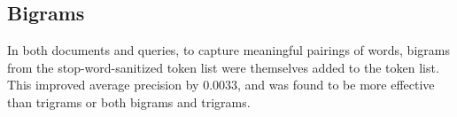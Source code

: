 \documentclass{article}
\begin{document}
\subsection{Bigrams}
In both documents and queries, to capture meaningful pairings of words, bigrams from the stop-word-sanitized token list were themselves added to the token list. This improved average precision by 0.0033, and was found to be more effective than trigrams or both bigrams and trigrams.
\end{document}
